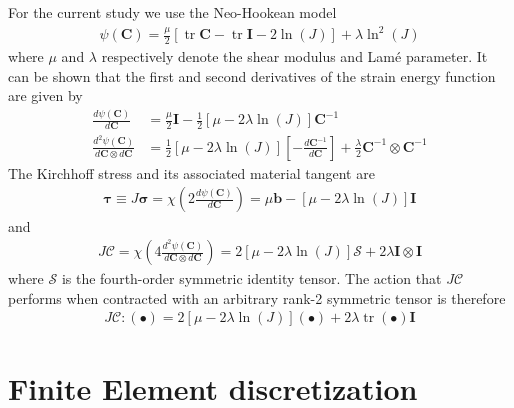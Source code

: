 \documentclass[preprint,12pt,times]{elsarticle}
\DeclareMathOperator{\trace}{tr}
\begin{document}
For the current study we use the Neo-Hookean model
\begin{gather}
\psi \left( \mathbf{C} \right)
  = \frac{\mu}{2} \left[ \trace{\mathbf{C}} - \trace{\mathbf{I}} - 2 \ln\left( J \right) \right]
  + \lambda \ln^{2}\left( J \right)
\end{gather}
where $\mu$ and $\lambda$ respectively denote the shear modulus and Lam\'{e} parameter. It can be shown that the first and second derivatives of the strain energy function are given by
\begin{align}
\frac{d \psi \left( \mathbf{C} \right)}{d \mathbf{C}}
  &= \frac{\mu}{2} \mathbf{I} - \frac{1}{2} \left[ \mu - 2\lambda\ln\left( J \right) \right] \mathbf{C}^{-1} \\
\frac{d^{2} \psi \left( \mathbf{C} \right)}{d \mathbf{C} \otimes d \mathbf{C}}
  &= \frac{1}{2}\left[ \mu - 2\lambda\ln\left( J \right) \right] \left[ - \frac{d \mathbf{C}^{-1}}{d \mathbf{C}} \right]
  + \frac{\lambda}{2} \mathbf{C}^{-1} \otimes \mathbf{C}^{-1}
\end{align}
The Kirchhoff stress and its associated material tangent are
\begin{gather}
\boldsymbol{\tau}
  \equiv J \boldsymbol{\sigma}
  = \chi\left( 2 \frac{d \psi \left( \mathbf{C} \right)}{d \mathbf{C}} \right)
  = \mu \mathbf{b} - \left[ \mu - 2\lambda\ln\left( J \right) \right] \mathbf{I}
\end{gather}
and
\begin{gather}
J \boldsymbol{\mathcal{C}}
  = \chi\left( 4 \frac{d^{2} \psi \left( \mathbf{C} \right)}{d \mathbf{C} \otimes d \mathbf{C}} \right)
  = 2 \left[ \mu - 2\lambda\ln\left( J \right) \right] \boldsymbol{\mathcal{S}}
  + 2 \lambda \mathbf{I} \otimes \mathbf{I}
\end{gather}
where $\boldsymbol{\mathcal{S}}$ is the fourth-order symmetric identity tensor.
The action that $J \boldsymbol{\mathcal{C}}$ performs when contracted with an arbitrary rank-2 symmetric tensor is therefore
\begin{gather}
J \boldsymbol{\mathcal{C}} : \left( \bullet \right)
  = 2 \left[ \mu - 2\lambda\ln\left( J \right) \right] \left( \bullet \right)
  + 2 \lambda \trace\left( \bullet \right) \mathbf{I}
\label{eq:simplified_action}
\end{gather}

\section{Finite Element discretization}
\label{sec:fe}
\end{document}

